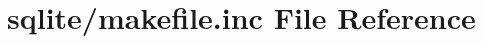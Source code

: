 \hypertarget{sqlite_2makefile_8inc}{\section{sqlite/makefile.inc \-File \-Reference}
\label{sqlite_2makefile_8inc}
}
